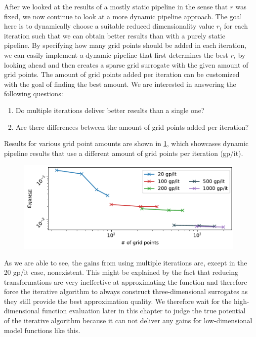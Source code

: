\documentclass[
  a4paper,  %
  twoside,  %
  bibliography=totoc,
  headsepline,
  cleardoublepage=empty,
  parskip=half,
  draft=false
]{scrbook}
\begin{document}
After we looked at the results of a mostly static pipeline in the sense that $r$ was fixed, we now continue to look at a more dynamic pipeline approach.
The goal here is to dynamically choose a suitable reduced dimensionality value $r_i$ for each iteration such that we can obtain better results than with a purely static pipeline.
By specifying how many grid points should be added in each iteration, we can easily implement a dynamic pipeline that first determines the best $r_i$ by looking ahead and then creates a sparse grid surrogate with the given amount of grid points.
The amount of grid points added per iteration can be customized with the goal of finding the best amount.
We are interested in answering the following questions:
\begin{enumerate}
\item Do multiple iterations deliver better results than a single one?
\item Are there differences between the amount of grid points added per iteration?
\end{enumerate}
Results for various grid point amounts are shown in \cref{fig:ishigami_dyn}, which showcases dynamic pipeline results that use a different amount of grid points per iteration (gp/it).

\begin{mdframed}[style=style]
\begin{figure}[H]
\vspace{-2mm}
\includegraphics[width=\textwidth]{graphics/ishigami_dynamic}\vspace{-4mm}
\delimit
{}
\label{fig:ishigami_dyn}
\end{figure}
\end{mdframed}
%
As we are able to see, the gains from using multiple iterations are, except in the 20 gp/it case, nonexistent.
This might be explained by the fact that reducing transformations are very ineffective at approximating the function and therefore force the iterative algorithm to always construct three-dimensional surrogates as they still provide the best approximation quality.
We therefore wait for the high-dimensional function evaluation later in this chapter to judge the true potential of the iterative algorithm because it can not deliver any gains for low-dimensional model functions like this.
\end{document}
